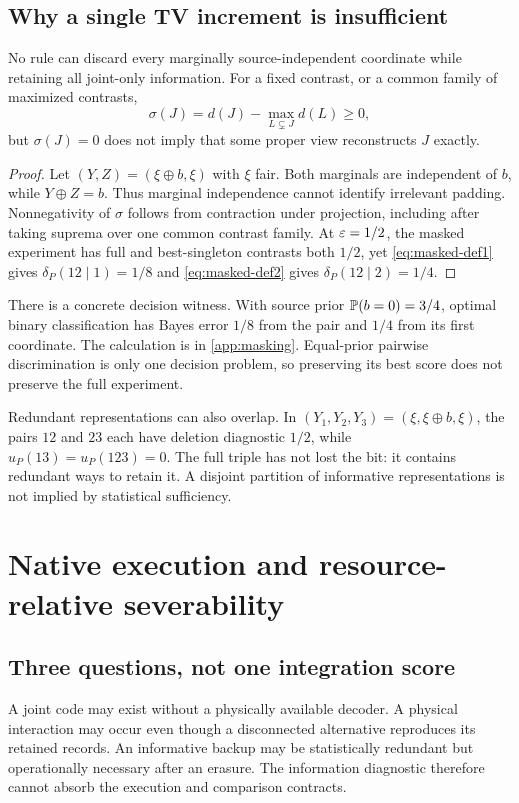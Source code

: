 \subsection{Why a single TV increment is insufficient}
\begin{proposition}\label{p2-09}
No rule can discard every marginally source-independent coordinate while retaining all joint-only information. For a fixed contrast, or a common family of maximized contrasts,
\[
 \sigma(J)=d(J)-\max_{L\subsetneq J}d(L)\ge0,
\]
but \(\sigma(J)=0\) does not imply that some proper view reconstructs \(J\) exactly.
\end{proposition}
\begin{proof}
Let \((Y,Z)=(\xi\oplus b,\xi)\) with \(\xi\) fair. Both marginals are independent of \(b\), while \(Y\oplus Z=b\). Thus marginal independence cannot identify irrelevant padding. Nonnegativity of \(\sigma\) follows from contraction under projection, including after taking suprema over one common contrast family. At \(\varepsilon=1/2\), the masked experiment has full and best-singleton contrasts both \(1/2\), yet \cref{eq:masked-def1} gives \(\delta_P(12\mid1)=1/8\) and \cref{eq:masked-def2} gives \(\delta_P(12\mid2)=1/4\).
\end{proof}
There is a concrete decision witness. With source prior \(\mathbb P(b=0)=3/4\), optimal binary classification has Bayes error \(1/8\) from the pair and \(1/4\) from its first coordinate. The calculation is in \cref{app:masking}. Equal-prior pairwise discrimination is only one decision problem, so preserving its best score does not preserve the full experiment.

Redundant representations can also overlap. In \((Y_1,Y_2,Y_3)=(\xi,\xi\oplus b,\xi)\), the pairs \(12\) and \(23\) each have deletion diagnostic \(1/2\), while \(u_P(13)=u_P(123)=0\). The full triple has not lost the bit: it contains redundant ways to retain it. A disjoint partition of informative representations is not implied by statistical sufficiency.



\section{Native execution and resource-relative severability}\label{sec:execution}
\subsection{Three questions, not one integration score}
A joint code may exist without a physically available decoder. A physical interaction may occur even though a disconnected alternative reproduces its retained records. An informative backup may be statistically redundant but operationally necessary after an erasure. The information diagnostic therefore cannot absorb the execution and comparison contracts.

